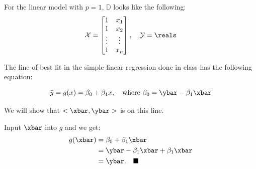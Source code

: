 \documentclass[12pt]{article}
\begin{document}
\newpage

\begin{enumerate}


\begin{tcolorbox}[colback = white, sharp corners]

For the linear model with $p=1$, $\mathbb{D}$ looks like the following: 
\[
\mathcal{X} = \begin{bmatrix} 1 & x_1 \\
1 & x_2 \\
\vdots & \vdots \\
1 & x_n \end{bmatrix}, \quad \mathcal{Y} = \reals
\]

\end{tcolorbox}


\begin{tcolorbox}[colback=white, sharp corners]

The line-of-best fit in the simple linear regression done in class has the following equation: 

\[
	\hat{y} = g(x) = \beta_0 + \beta_1 x, \quad \text{where } \beta_0 = \ybar - \beta_1 \xbar
\]

We will show that $<\xbar, \ybar>$ is on this line. 

Input $\xbar$ into $g$ and we get: 
\begin{align*}
	g(\xbar) &= \beta_0 + \beta_1 \xbar \\
			&= \ybar - \beta_1 \xbar + \beta_1 \xbar \\
			&= \ybar. \quad \blacksquare
\end{align*}


\end{tcolorbox}


\end{enumerate}
\end{document}
